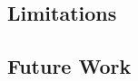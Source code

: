 \documentclass[11pt,a4paper]{article}
\begin{document}

\subsection{Limitations}
\label{subsec:limitations}


\subsection{Future Work}
\label{subsec:future_work}
\end{document}
